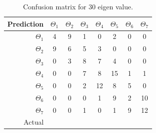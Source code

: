 \documentclass[runningheads,a4paper]{llncs}
\begin{document}
\begin{table}
\centering
\caption{Confusion matrix for $30$ eigen value.}
\label{tab:conf30}
\begin{tabular}{@{}r|ccccccc@{}}
\toprule
Prediction & \multicolumn{1}{r}{$\Theta_1$} & \multicolumn{1}{r}{$\Theta_2$} & \multicolumn{1}{r}{$\Theta_3$} & \multicolumn{1}{r}{$\Theta_4$} & \multicolumn{1}{r}{$\Theta_5$} & \multicolumn{1}{r}{$\Theta_6$} & \multicolumn{1}{r}{$\Theta_7$} \\ \midrule
$\Theta_1$ & 4                              & 9                              & 1                              & 0                              & 2                              & 0                              & 0                              \\
$\Theta_2$ & 9                              & 6                              & 5                              & 3                              & 0                              & 0                              & 0                              \\
$\Theta_3$ & 0                              & 3                              & 8                              & 7                              & 4                              & 0                              & 0                              \\
$\Theta_4$ & 0                              & 0                              & 7                              & 8                              & 15                             & 1                              & 1                              \\
$\Theta_5$ & 0                              & 0                              & 2                              & 12                             & 8                              & 5                              & 0                              \\
$\Theta_6$ & 0                              & 0                              & 0                              & 1                              & 9                              & 2                              & 10                             \\
$\Theta_7$ & 0                              & 0                              & 1                              & 0                              & 1                              & 9                              & 12                             \\ \midrule
Actual     & \multicolumn{1}{l}{}           & \multicolumn{1}{l}{}           & \multicolumn{1}{l}{}           & \multicolumn{1}{l}{}           & \multicolumn{1}{l}{}           & \multicolumn{1}{l}{}           & \multicolumn{1}{l}{}           \\ \cmidrule(r){1-1}
\end{tabular}
\end{table}
\end{document}
